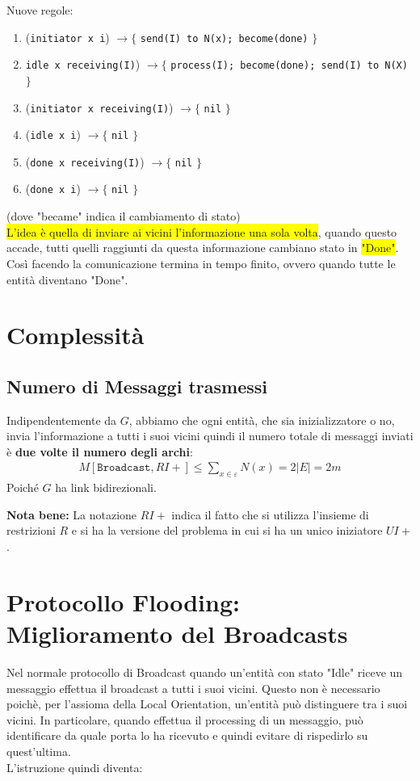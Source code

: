 Nuove regole:
\begin{enumerate}
  \item (\texttt{initiator x i}) $\rightarrow \lbrace$ \texttt{send(I) to N(x); become(done)} $\rbrace$
  \item \texttt{idle x receiving(I)}) $\rightarrow \lbrace$ \texttt{process(I); become(done); send(I) to N(X)} $\rbrace$
  \item (\texttt{initiator x receiving(I)}) $\rightarrow \lbrace$ \texttt{nil} $\rbrace$
  \item (\texttt{idle x i}) $\rightarrow \lbrace$ \texttt{nil} $\rbrace$
  \item (\texttt{done x receiving(I)}) $\rightarrow \lbrace$ \texttt{nil} $\rbrace$
  \item (\texttt{done x i}) $\rightarrow \lbrace$ \texttt{nil} $\rbrace$
\end{enumerate}

(dove "became" indica il cambiamento di stato)\\

\colorbox{yellow}{L'idea è quella di inviare ai vicini l'informazione una sola volta}, quando questo accade, tutti quelli raggiunti da questa informazione cambiano stato in \colorbox{yellow}{"Done"}. Così facendo la comunicazione termina in tempo finito, ovvero quando tutte le entità diventano "Done".

\section{Complessità}
\subsection{Numero di Messaggi trasmessi}
Indipendentemente da $G$, abbiamo che ogni entità, che sia inizializzatore o no, invia l'informazione a tutti i suoi vicini quindi il numero totale di messaggi inviati è \textbf{due volte il numero degli archi}:
\begin{eqnarray}
  M[\texttt{Broadcast}, RI+]  \leq \sum_{x \in \varepsilon} N(x) = 2|E| = 2m
  \nonumber
\end{eqnarray}
Poiché $G$ ha link bidirezionali.

\textbf{Nota bene:} La notazione $RI+$ indica il fatto che si utilizza l'insieme di restrizioni $R$ e si ha la versione del problema in cui si ha un unico iniziatore $UI+$.

\section{Protocollo Flooding: Miglioramento del Broadcasts}
Nel normale protocollo di Broadcast quando un'entità con stato "Idle" riceve un messaggio effettua il broadcast a tutti i suoi vicini. Questo non è necessario poichè, per l'assioma della Local Orientation, un'entità può distinguere tra i suoi vicini. In particolare, quando effettua il processing di un messaggio, può identificare da quale porta lo ha ricevuto e quindi evitare di rispedirlo su quest'ultima.\\
L'istruzione quindi diventa:

